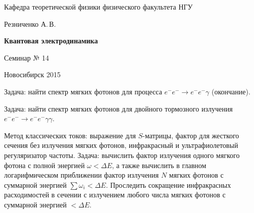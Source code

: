 \documentclass[12pt,pagesize,paper=192mm:108mm]{scrbook}
\begin{document}
\begin{titlepage}
\begin{center}
    Кафедра теоретической физики физического факультета НГУ
    \medskip

    \Large
    Резниченко А.\,В.
    \bigskip

    \huge
    \textbf{Квантовая электродинамика}
    \bigskip

    \Large
    Семинар № 14
    \vfill

    \normalsize
    \vfill

    \normalsize \ccbysa\hspace{0.5em}  Новосибирск 2015
  \end{center}
\end{titlepage}
\newpage

\vspace*{-1em}
\begin{center}
\vfill
  \begin{minipage}{0.65\linewidth}
    Задача: найти спектр мягких фотонов для процесса $e^-e^-\to e^-e^-\gamma$
    (окончание).
    \smallskip

    Задача: найти спектр мягких фотонов для двойного тормозного
    излучения $e^-e^-\to e^-e^-\gamma\gamma$.
    \smallskip

    Метод классических токов: выражение для $S$-матрицы, фактор для
    жесткого сечения без излучения мягких фотонов, инфракрасный и
    ультрафиолетовый регуляризатор частоты. Задача: вычислить фактор
    излучения одного мягкого фотона с полной энергией $\omega<\Delta
    E$, а также вычислить в главном логарифмическом приближении фактор
    излучения $N$ мягких фотонов с суммарной энергией $\sum\omega_i
    <\Delta E$. Проследить сокращение инфракрасных расходимостей в
    сечении с излучением любого числа мягких фотонов с суммарной
    энергией $<\Delta E$.

  \end{minipage}
  \vfill

\end{center}
\end{document}
